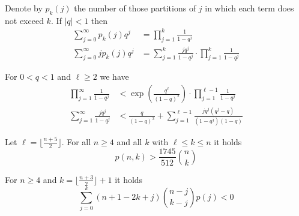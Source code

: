 \documentclass[10pt,a4paper]{amsart}
\newcommand{\abs}[1]{\lvert#1\rvert}
\begin{document}
\begin{lem}\label{gen}
Denote by $p_k(j)$ the number of those partitions of $j$ in which each term
does not exceed $k$. If $\abs q<1$ then
\begin{align}\label{pro}
\sum_{j=0}^{\infty}p_k(j)q^j & =\prod_{j=1}^k\frac{1}{1-q^j}\\
\sum_{j=0}^{\infty}jp_k(j)q^j & =\sum_{j=1}^k\frac{jq^j}{1-q^j}\cdot \prod_{j=1}^k\frac{1}{1-q^j}
\end{align}
\end{lem}

\begin{lem}\label{rest}
For $0<q<1$ and $\ell \ge 2$ we have
\begin{align}\label{ab}
\prod_{j=1}^{\infty}\frac{1}{1-q^j} & <\exp{\left(\frac{q^{\ell}}{(1-q)^2}\right)}\cdot 
\prod_{j=1}^{\ell -1}\frac{1}{1-q^j}\\ 
\sum_{j=1}^{\infty}\frac{jq^j}{1-q^j} & <\frac{q}{(1-q)^3}+
\sum_{j=1}^{\ell -1}\frac{jq^j(q^j-q)}{(1-q^j)(1-q)}
\end{align}
\end{lem}               

\begin{lem}\label{gr}
Let $\ell=\lfloor \frac{n+5}{2} \rfloor$.
For all $n\ge 4$ and all $k$ with $\ell\le k\le n$ it holds
\begin{equation*}
p(n,k)>\frac{1745}{512}\binom{n}{k}  
\end{equation*}
\end{lem}

\begin{lem}\label{rechts}
For $n\ge 4$ and $k=\lfloor\frac{n+3}{2}\rfloor + 1$ it holds
\begin{equation}\label{l2}
\sum_{j=0}^k (n+1-2k+j)\binom{n-j}{k-j}p(j)<0
\end{equation}
\end{lem} 
\end{document}
